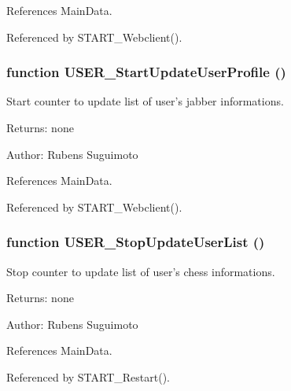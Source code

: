 References MainData.

Referenced by START\_\-Webclient().
\subsubsection[USER\_\-StartUpdateUserProfile]{\setlength{\rightskip}{0pt plus 5cm}function USER\_\-StartUpdateUserProfile ()}\label{contact_2user_8js_a5f4ccd58f4b047f483537f16c4aafba}


Start counter to update list of user's jabber informations. 

\begin{Desc}
\item[Returns:]none \end{Desc}
\begin{Desc}
\item[Author:]Rubens Suguimoto \end{Desc}


References MainData.

Referenced by START\_\-Webclient().
\subsubsection[USER\_\-StopUpdateUserList]{\setlength{\rightskip}{0pt plus 5cm}function USER\_\-StopUpdateUserList ()}\label{contact_2user_8js_f6a9c34a7c08138de5e07909e4a90aad}


Stop counter to update list of user's chess informations. 

\begin{Desc}
\item[Returns:]none \end{Desc}
\begin{Desc}
\item[Author:]Rubens Suguimoto \end{Desc}


References MainData.

Referenced by START\_\-Restart().
